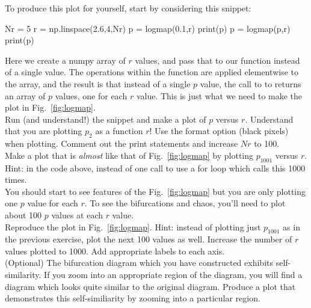 To produce this plot for yourself, start by considering this snippet:
\begin{python}
Nr = 5
r = np.linspace(2.6,4,Nr)
p = logmap(0.1,r)
print(p)
p = logmap(p,r)
print(p)
\end{python}
Here we create a numpy array of $r$ values, and pass that to our
 function instead of a single value.  The operations
within the function are applied elementwise to the array, and the
result is that instead of a single $p$ value, the call to to
 returns an array of $p$ values, one for each $r$
value.  This is just what we need to make the plot in Fig.~\ref{fig:logmap}.\\

\plot Run (and understand!) the snippet and make a plot of $p$ versus
$r$.  Understand that you are plotting $p_2$ as a function $r$!  Use
the  format option (black pixels) when plotting.  Comment
out the print statements and increase $Nr$ to 100.\\

\plot Make a plot that is {\em almost} like that of
Fig.~\ref{fig:logmap} by plotting $p_{1001}$ versus $r$.  Hint:
in the code above, instead of one call to  use a for loop which
calls this 1000 times.\\

You should start to see features of the Fig.~\ref{fig:logmap} but you are only plotting one $p$ value for each $r$.  To see the bifurcations and chaos, you'll need to plot about 100 $p$ values at each $r$ value.\\

\plot Reproduce the plot in Fig.~\ref{fig:logmap}.  Hint: instead of plotting just $p_{1001}$ as in the previous exercise, plot the next 100 values as well.  Increase the number of $r$ values plotted to 1000.  Add appropriate labels to each axis.\\

\plot (Optional) The bifurcation diagram which you have constructed
exhibits self-similarity.  If you zoom into an appropriate region of
the diagram, you will find a diagram which looks quite similar to the
original diagram.  Produce a plot that demonstrates this
self-similiarity by zooming into a particular region.
